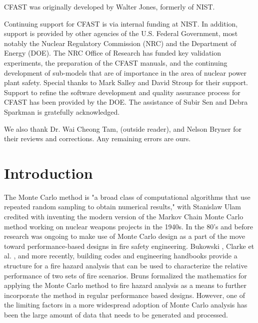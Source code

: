 \documentclass[12pt,twoside]{book}
\begin{document}
\label{acksection}

CFAST was originally developed by Walter Jones, formerly of NIST.

Continuing support for CFAST is via internal funding at NIST. In addition, support is provided by other agencies of the U.S. Federal Government, most notably the Nuclear Regulatory Commission (NRC) and the Department of Energy (DOE). The NRC Office of Research has funded key validation experiments, the preparation of the CFAST manuals, and the continuing development of sub-models that are of importance in the area of nuclear power plant safety. Special thanks to Mark Salley and David Stroup for their support. Support to refine the software development and quality assurance process for CFAST has been provided by the DOE. The assistance of Subir Sen and Debra Sparkman is gratefully acknowledged.

We also thank Dr. Wai Cheong Tam, (outside reader), and Nelson Bryner for their reviews and corrections. Any remaining errors are ours.

\cleardoublepage
\tableofcontents

\clearpage
\listoffigures

\listoftables


\mainmatter

%
%

\chapter{Introduction}

The Monte Carlo method is "a broad class of computational algorithms that use repeated random sampling to obtain numerical results," \cite{wikipedia_montecarlo} with Stanislaw Ulam credited with inventing the modern version of the Markov Chain Monte Carlo method working on nuclear weapons projects in the 1940s. \cite{Metropolis:1987} In the 80’s and before research was ongoing to make use of Monte Carlo design as a part of the move toward performance-based designs in fire safety engineering. Bukowski \cite{Bukowski_1985}, Clarke et al. \cite{Clarke_1990}, and more recently, building codes \cite{NFPA_5000} and engineering handbooks \cite{Hurley_2016} provide a structure for a fire hazard analysis that can be used to characterize the relative performance of two sets of fire scenarios. Bruns \cite{bruns_tn_2016} formalized the mathematics for applying the Monte Carlo method to fire hazard analysis as a means to further incorporate the method in regular performance based designs. However, one of the limiting factors in a more widespread adoption of Monte Carlo analysis has been the large amount of data that needs to be generated and processed.
\end{document}
